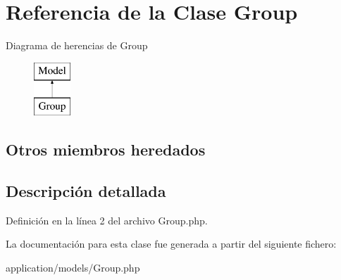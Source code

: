 \hypertarget{class_group}{}\section{Referencia de la Clase Group}
\label{class_group}
Diagrama de herencias de Group\begin{figure}[H]
\begin{center}
\leavevmode
\includegraphics[height=2.000000cm]{class_group}
\end{center}
\end{figure}
\subsection*{Otros miembros heredados}


\subsection{Descripción detallada}


Definición en la línea 2 del archivo Group.\+php.



La documentación para esta clase fue generada a partir del siguiente fichero\+:\begin{DoxyCompactItemize}
\item 
application/models/Group.\+php\end{DoxyCompactItemize}

